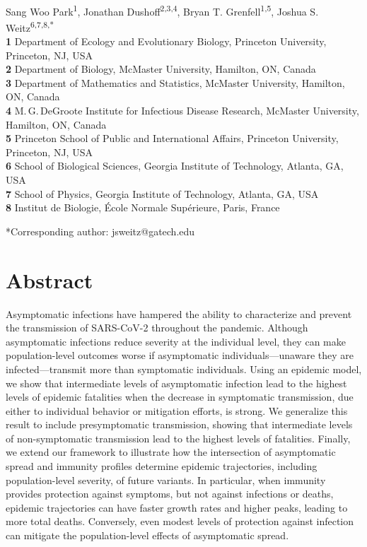\documentclass[12pt]{article}
\date{\today}
\begin{document}
\begin{flushleft}{
	\Large
	\textbf{}
}
\newline
\\
Sang Woo Park\textsuperscript{1},
Jonathan Dushoff\textsuperscript{2,3,4},
Bryan T. Grenfell\textsuperscript{1,5},
Joshua S. Weitz\textsuperscript{6,7,8,*}
\\
\bigskip
\textbf{1} Department of Ecology and Evolutionary Biology, Princeton University, Princeton, NJ, USA
\\
\textbf{2} Department of Biology, McMaster University, Hamilton, ON, Canada
\\
\textbf{3} Department of Mathematics and Statistics, McMaster University, Hamilton, ON, Canada
\\
\textbf{4} M.\,G.\,DeGroote Institute for Infectious Disease Research, McMaster University, Hamilton, ON, Canada
\\
\textbf{5} Princeton School of Public and International Affairs, Princeton University, Princeton, NJ, USA
\\
\textbf{6} School of Biological Sciences, Georgia Institute of Technology, Atlanta, GA, USA
\\
\textbf{7} School of Physics, Georgia Institute of Technology, Atlanta, GA, USA
\\
\textbf{8} Institut de Biologie, \'{E}cole Normale Sup\'{e}rieure, Paris, France
\\
\bigskip

*Corresponding author: jsweitz@gatech.edu
\bigskip
\end{flushleft}

\section*{Abstract}

Asymptomatic infections have hampered the ability to characterize and prevent the transmission of SARS-CoV-2 throughout the pandemic.
Although asymptomatic infections reduce severity at the individual level, they can make population-level outcomes worse if asymptomatic individuals---unaware they are infected---transmit more than symptomatic individuals.
Using an epidemic model, we show that intermediate levels of asymptomatic infection lead to the highest levels of epidemic fatalities when the decrease in symptomatic transmission, due either to individual behavior or mitigation efforts, is strong. 
We generalize this result to include presymptomatic transmission, showing that intermediate levels of non-symptomatic transmission lead to the highest levels of fatalities.
Finally, we extend our framework to illustrate how the intersection of asymptomatic spread and immunity profiles determine epidemic trajectories, including population-level severity, of future variants.
In particular, when immunity provides protection against symptoms, but not against infections or deaths, epidemic trajectories can have faster growth rates and higher peaks, leading to more total deaths.
Conversely, even modest levels of protection against infection can mitigate the population-level effects of asymptomatic spread.
\end{document}
